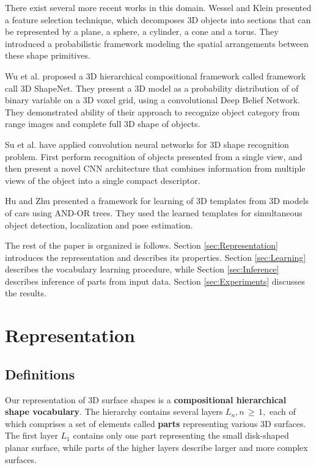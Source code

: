 \documentclass[runningheads]{llncs}
\begin{document}
There exist several more recent works in this domain.  Wessel and
Klein \cite{pratikakis2010learning} presented a feature selection
technique, which decomposes 3D objects into sections that can be
represented by a plane, a sphere, a cylinder, a cone and a torus.
They introduced a probabilistic framework modeling the spatial
arrangements between these shape primitives.

Wu et al. \cite{wu20153d} proposed a 3D hierarchical compositional
framework called framework call 3D ShapeNet. They present a 3D model
as a probability distribution of of binary variable on a 3D voxel
grid, using a convolutional Deep Belief Network. They demonstrated
ability of their approach to recognize object category from range
images and complete full 3D shape of objects.

Su et al. \cite{Su_2015_ICCV} have applied convolution neural
networks for 3D shape recognition problem. First perform recognition
of objects presented from a single view, and then present a novel
CNN architecture that combines information from multiple views of
the object into a single compact descriptor.

Hu and Zhu \cite{hu2015learning} presented a framework for learning
of 3D templates from 3D models of cars using AND-OR trees. They used
the learned templates for simultaneous object detection,
localization and pose estimation.

The rest of the paper is organized is follows. Section
\ref{sec:Representation} introduces the representation and describes
its properties. Section \ref{sec:Learning} describes the vocabulary
learning procedure, while Section \ref{sec:Inference} describes
inference of parts from input data. Section \ref{sec:Experiments}
discusses the results.

\section{Representation\label{sec:Representation}}


\subsection{Definitions\label{sec:Definitions}}

Our representation of 3D surface shapes is a \textbf{compositional
hierarchical shape vocabulary}. The hierarchy contains several
layers $L_n, n\,{\geqslant}\,1,$ each of which comprises a set of
elements called \textbf{parts} representing various 3D surfaces. The
first layer $L_1$ contains only one part representing the small
disk-shaped planar surface, while parts of the higher layers
describe larger and more complex surfaces.
\end{document}
